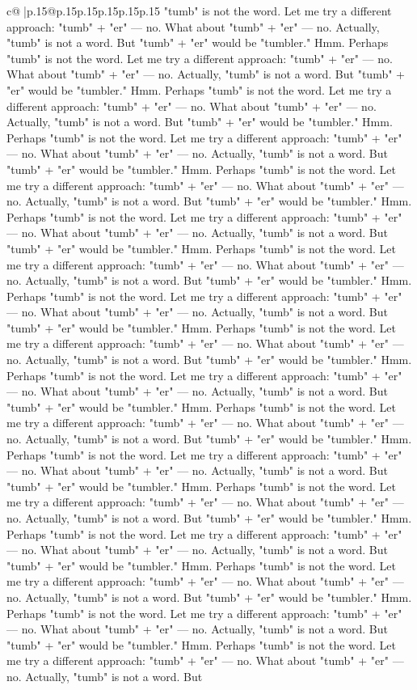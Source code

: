 \documentclass{article}
\begin{document}
{\begin{supertabular}{c@{$\;$}|p{.15\linewidth}@{}p{.15\linewidth}p{.15\linewidth}p{.15\linewidth}p{.15\linewidth}p{.15\linewidth}}
{{{"tumb" is not the word. Let me try a different approach: "tumb" + "er" — no. What about "tumb" + "er" — no. Actually, "tumb" is not a word. But "tumb" + "er" would be "tumbler." Hmm. Perhaps "tumb" is not the word. Let me try a different approach: "tumb" + "er" — no. What about "tumb" + "er" — no. Actually, "tumb" is not a word. But "tumb" + "er" would be "tumbler." Hmm. Perhaps "tumb" is not the word. Let me try a different approach: "tumb" + "er" — no. What about "tumb" + "er" — no. Actually, "tumb" is not a word. But "tumb" + "er" would be "tumbler." Hmm. Perhaps "tumb" is not the word. Let me try a different approach: "tumb" + "er" — no. What about "tumb" + "er" — no. Actually, "tumb" is not a word. But "tumb" + "er" would be "tumbler." Hmm. Perhaps "tumb" is not the word. Let me try a different approach: "tumb" + "er" — no. What about "tumb" + "er" — no. Actually, "tumb" is not a word. But "tumb" + "er" would be "tumbler." Hmm. Perhaps "tumb" is not the word. Let me try a different approach: "tumb" + "er" — no. What about "tumb" + "er" — no. Actually, "tumb" is not a word. But "tumb" + "er" would be "tumbler." Hmm. Perhaps "tumb" is not the word. Let me try a different approach: "tumb" + "er" — no. What about "tumb" + "er" — no. Actually, "tumb" is not a word. But "tumb" + "er" would be "tumbler." Hmm. Perhaps "tumb" is not the word. Let me try a different approach: "tumb" + "er" — no. What about "tumb" + "er" — no. Actually, "tumb" is not a word. But "tumb" + "er" would be "tumbler." Hmm. Perhaps "tumb" is not the word. Let me try a different approach: "tumb" + "er" — no. What about "tumb" + "er" — no. Actually, "tumb" is not a word. But "tumb" + "er" would be "tumbler." Hmm. Perhaps "tumb" is not the word. Let me try a different approach: "tumb" + "er" — no. What about "tumb" + "er" — no. Actually, "tumb" is not a word. But "tumb" + "er" would be "tumbler." Hmm. Perhaps "tumb" is not the word. Let me try a different approach: "tumb" + "er" — no. What about "tumb" + "er" — no. Actually, "tumb" is not a word. But "tumb" + "er" would be "tumbler." Hmm. Perhaps "tumb" is not the word. Let me try a different approach: "tumb" + "er" — no. What about "tumb" + "er" — no. Actually, "tumb" is not a word. But "tumb" + "er" would be "tumbler." Hmm. Perhaps "tumb" is not the word. Let me try a different approach: "tumb" + "er" — no. What about "tumb" + "er" — no. Actually, "tumb" is not a word. But "tumb" + "er" would be "tumbler." Hmm. Perhaps "tumb" is not the word. Let me try a different approach: "tumb" + "er" — no. What about "tumb" + "er" — no. Actually, "tumb" is not a word. But "tumb" + "er" would be "tumbler." Hmm. Perhaps "tumb" is not the word. Let me try a different approach: "tumb" + "er" — no. What about "tumb" + "er" — no. Actually, "tumb" is not a word. But "tumb" + "er" would be "tumbler." Hmm. Perhaps "tumb" is not the word. Let me try a different approach: "tumb" + "er" — no. What about "tumb" + "er" — no. Actually, "tumb" is not a word. But "tumb" + "er" would be "tumbler." Hmm. Perhaps "tumb" is not the word. Let me try a different approach: "tumb" + "er" — no. What about "tumb" + "er" — no. Actually, "tumb" is not a word. But }}}
\end{supertabular}}
\end{document}
